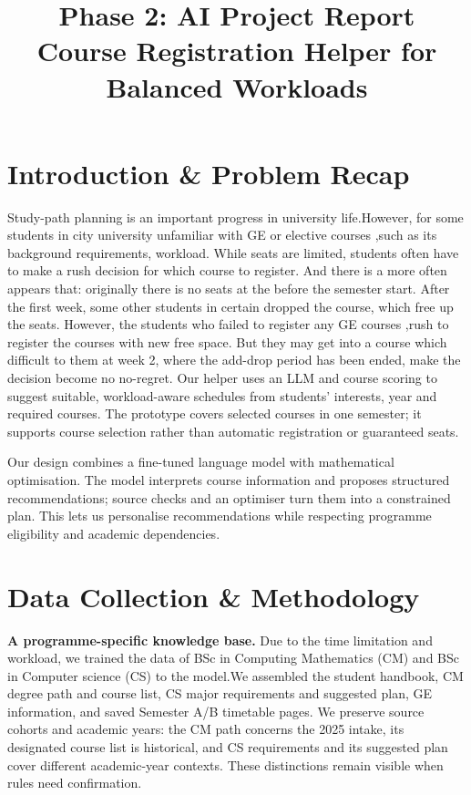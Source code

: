 \documentclass{article}
\title{Phase 2: AI Project Report\\
\large Course Registration Helper for Balanced Workloads}
\author{}
\begin{document}
\maketitle

\section{Introduction \& Problem Recap}
Study-path planning is an important progress in university life.However, for some students in city university unfamiliar with GE or elective courses ,such as its background requirements, workload. While seats are limited, students often have to make a rush decision for which course to register. And there is a more often appears that: originally there is no seats at the before the semester start. After the first week, some other students in certain dropped the course, which free up the seats. However, the students who failed to register any GE courses ,rush to register the courses with new free space. But they may get into a course which difficult to them at week 2, where the add-drop period has been ended, make the decision become no no-regret.
Our helper uses an LLM and course scoring to suggest suitable, workload-aware schedules from students' interests, year and required courses. The prototype covers selected courses in one semester; it supports course selection rather than automatic registration or guaranteed seats.

Our design combines a fine-tuned language model with mathematical optimisation. The model interprets course information and proposes structured recommendations; source checks and an optimiser turn them into a constrained plan. This lets us personalise recommendations while respecting programme eligibility and academic dependencies.



\section{Data Collection \& Methodology}
\textbf{A programme-specific knowledge base.} Due to the time limitation and workload, we trained the data of BSc in Computing Mathematics (CM) and BSc in Computer science (CS) to the model.We assembled the student handbook, CM degree path and course list, CS major requirements and suggested plan, GE information, and saved Semester A/B timetable pages\citep{cityu-programmes}. We preserve source cohorts and academic years: the CM path concerns the 2025 intake, its designated course list is historical, and CS requirements and its suggested plan cover different academic-year contexts. These distinctions remain visible when rules need confirmation.
\end{document}
